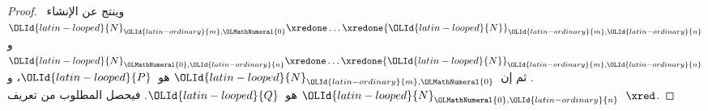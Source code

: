\documentclass[../../../include/open-logic-section]{subfiles}
\begin{document}
\begin{proof}
  وينتج عن الإنشاء~${\OLId{latin-looped}{N}}_{{\OLId{latin-ordinary}{m}},{\OLMathNumeral{0}}} \xredone \dots \xredone {\OLId{latin-looped}{N}}_{{\OLId{latin-ordinary}{m}},{\OLId{latin-ordinary}{n}}}$ و${\OLId{latin-looped}{N}}_{{\OLMathNumeral{0}},{\OLId{latin-ordinary}{n}}} \xredone \dots \xredone {\OLId{latin-looped}{N}}_{{\OLId{latin-ordinary}{m}},{\OLId{latin-ordinary}{n}}}$.
  ثم إن~${\OLId{latin-looped}{N}}_{{\OLId{latin-ordinary}{m}},{\OLMathNumeral{0}}}$ هو~${\OLId{latin-looped}{P}}$، و${\OLId{latin-looped}{N}}_{{\OLMathNumeral{0}},{\OLId{latin-ordinary}{n}}}$ هو~${\OLId{latin-looped}{Q}}$.
  فيحصل المطلوب من تعريف~$\xred$.
\end{proof}
\end{document}
